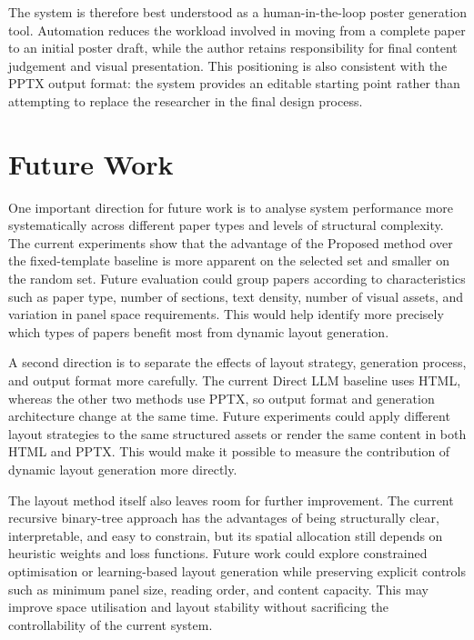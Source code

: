\documentclass[12pt,oneside]{report}
\begin{document}
\vspace{1em}

The system is therefore best understood as a human-in-the-loop poster generation tool. Automation reduces the workload involved in moving from a complete paper to an initial poster draft, while the author retains responsibility for final content judgement and visual presentation. This positioning is also consistent with the PPTX output format: the system provides an editable starting point rather than attempting to replace the researcher in the final design process.

\section{Future Work}

One important direction for future work is to analyse system performance more systematically across different paper types and levels of structural complexity. The current experiments show that the advantage of the Proposed method over the fixed-template baseline is more apparent on the selected set and smaller on the random set. Future evaluation could group papers according to characteristics such as paper type, number of sections, text density, number of visual assets, and variation in panel space requirements. This would help identify more precisely which types of papers benefit most from dynamic layout generation.

\vspace{1em}

A second direction is to separate the effects of layout strategy, generation process, and output format more carefully. The current Direct LLM baseline uses HTML, whereas the other two methods use PPTX, so output format and generation architecture change at the same time. Future experiments could apply different layout strategies to the same structured assets or render the same content in both HTML and PPTX. This would make it possible to measure the contribution of dynamic layout generation more directly.

\vspace{1em}

The layout method itself also leaves room for further improvement. The current recursive binary-tree approach has the advantages of being structurally clear, interpretable, and easy to constrain, but its spatial allocation still depends on heuristic weights and loss functions. Future work could explore constrained optimisation or learning-based layout generation while preserving explicit controls such as minimum panel size, reading order, and content capacity. This may improve space utilisation and layout stability without sacrificing the controllability of the current system.
\end{document}
